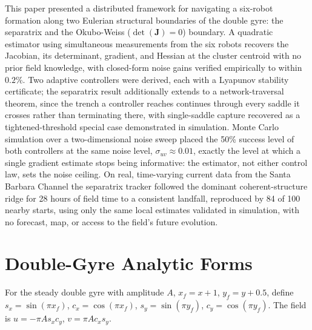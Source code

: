 \documentclass[lettersize,journal]{IEEEtran}
\begin{document}
This paper presented a distributed framework for navigating a six-robot
formation along two Eulerian structural boundaries of the double gyre: the
separatrix and the Okubo-Weiss ($\det(\mathbf{J}) = 0$) boundary. A quadratic
estimator using simultaneous measurements from the six robots recovers the
Jacobian, its determinant, gradient, and Hessian at the cluster centroid with
no prior field knowledge, with closed-form noise gains verified empirically
to within $0.2\%$. Two adaptive controllers were derived, each with a
Lyapunov stability certificate; the separatrix result additionally extends
to a network-traversal theorem, since the trench a controller reaches
continues through every saddle it crosses rather than terminating there,
with single-saddle capture recovered as a tightened-threshold special case
demonstrated in simulation. Monte Carlo simulation over a two-dimensional
noise sweep placed the 50\% success level of both controllers at the same
noise level, $\sigma_{uv} \approx 0.01$, exactly the level at which a
single gradient estimate stops being informative: the estimator, not
either control law, sets the noise ceiling. On real, time-varying current
data from the Santa Barbara Channel the separatrix tracker followed the
dominant coherent-structure ridge for 28 hours of field time to a
consistent landfall, reproduced by 84 of 100 nearby starts, using only
the same local estimates validated in simulation, with no forecast, map,
or access to the field's future evolution.


\appendices

\section{Double-Gyre Analytic Forms}
\label{app:analytic}

For the steady double gyre with amplitude $A$, $x_f = x + 1$,
$y_f = y + 0.5$, define $s_x = \sin(\pi x_f)$, $c_x = \cos(\pi x_f)$,
$s_y = \sin(\pi y_f)$, $c_y = \cos(\pi y_f)$. The field is
$u = -\pi A s_x c_y$, $v = \pi A c_x s_y$.
\end{document}
